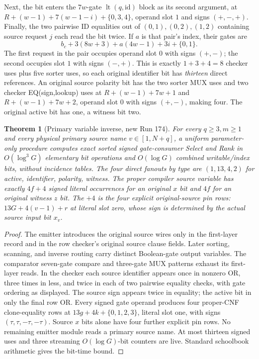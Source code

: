 \documentclass[11pt]{article}
\newtheorem{theorem}{Theorem}
\begin{document}
Next, the bit enters the $7w$-gate
$\operatorname{lt}(q,\mathrm{id})$ block as its second argument,
at $R+(w-1)+7(w-1-i)+\{0,3,4\}$, operand slot $1$ and
signs $(+,-,+)$. Finally, the two pairwise ID equalities
out of $(0,1),(0,2),(1,2)$ containing source request $j$
each read the bit twice. If $a$ is that pair's index, their
gates are
\[
 b_c+3(8w+3)+a(4w-1)+3i+\{0,1\}.
\]
The first request in the pair occupies operand slot $0$
with signs $(+,-)$; the second occupies slot $1$ with
signs $(-,+)$. This is exactly $1+3+4=8$ checker uses
plus five sorter uses, so each original identifier bit
has \emph{thirteen} direct references.
An original source polarity bit has the two sorter MUX uses
and two checker EQ(sign,lookup) uses at
$R+(w-1)+7w+1$ and $R+(w-1)+7w+2$, operand slot $0$
with signs $(+,-)$, making four. The original active bit
has one, a witness bit two.

\begin{theorem}[Primary variable inverse, new Run 174]
For every $q\ge3,m\ge1$ and every physical primary source
name $v\in[1,N+q]$, a uniform parameter-only procedure
computes exact sorted signed gate-consumer Select and Rank
in $O(\log^3G)$ elementary bit operations and
$O(\log G)$ combined writable/index bits, without incidence
tables. The four direct fanouts by type are $(1,13,4,2)$
for active, identifier, polarity, witness. The proper compiler
source variable has exactly $4f+4$ signed literal occurrences
for an original $x$ bit and $4f$ for an original witness $z$ bit.
The $+4$ is the four explicit original-source pin rows:
$13G+4(v-1)+r$ at literal slot zero, whose sign is determined
by the \emph{actual} source input bit $x_v$.
\end{theorem}
\begin{proof}
The emitter introduces the original source wires only in the
first-layer record and in the row checker's original source
clause fields. Later sorting, scanning, and inverse routing
carry distinct Boolean-gate output variables. The comparator
seven-gate compare and three-gate MUX patterns exhaust its
first-layer reads. In the checker each source identifier
appears once in nonzero OR, three times in less, and twice in
each of two pairwise equality checks, with gate ordering as
displayed. The source sign appears twice in equality;
the active bit in only the final row OR. Every signed gate
operand produces four proper-CNF clone-equality rows at
$13g+4k+\{0,1,2,3\}$, literal slot one, with signs
$(\tau,\tau,-\tau,-\tau)$. Source $x$ bits alone have
four further explicit pin rows. No remaining emitter module
reads a primary source name. At most thirteen signed uses
and three streaming $O(\log G)$-bit counters are live.
Standard schoolbook arithmetic gives the bit-time bound.
\end{proof}
\end{document}
